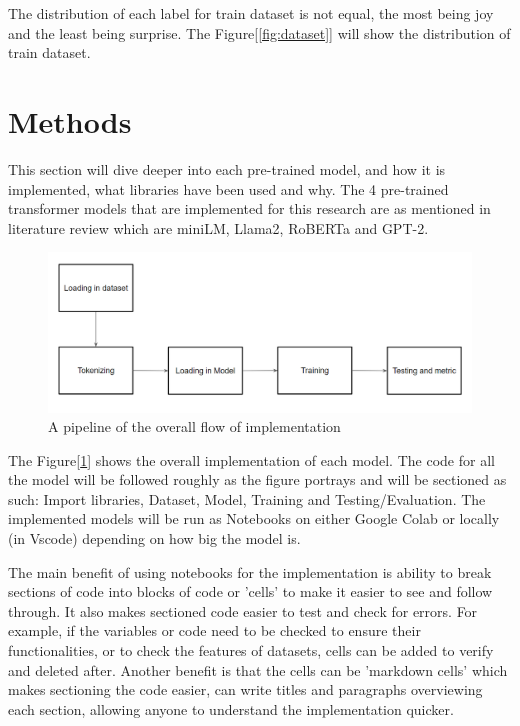 The distribution of each label for train dataset is not equal, the most being joy and the least being surprise. The Figure[\ref{fig:dataset}] will show the distribution of train dataset. 



\section{Methods}

This section will dive deeper into each pre-trained model, and how it is implemented, what libraries have been used and why. The 4 pre-trained transformer models that are implemented for this research are as mentioned in literature review which are miniLM, Llama2, RoBERTa and GPT-2.

\begin{figure}[ht]
    \centerline{\includegraphics[scale=0.45]{Figures/problem_pipeline.png}}
    \caption{A pipeline of the overall flow of implementation}
    \label{fig:pipeline}
\end{figure}

The Figure[\ref{fig:pipeline}] shows the overall implementation of each model. The code for all the model will be followed roughly as the figure portrays and will be sectioned as such: Import libraries, Dataset, Model, Training and Testing/Evaluation. The implemented models will be run as Notebooks on either Google Colab or locally (in Vscode) depending on how big the model is.

The main benefit of using notebooks for the implementation is ability to break sections of code into blocks of code or 'cells' to make it easier to see and follow through. It also makes sectioned code easier to test and check for errors. For example, if the variables or code need to be checked to ensure their functionalities, or to check the features of datasets, cells can be added to verify and deleted after. Another benefit is that the cells can be 'markdown cells' which makes sectioning the code easier, can write titles and paragraphs overviewing each section, allowing anyone to understand the implementation quicker.

